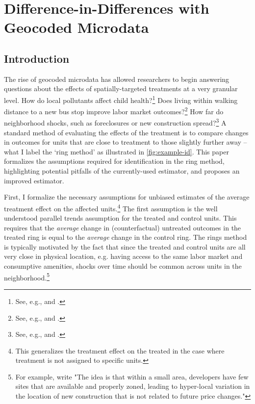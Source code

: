 \chapter{Difference-in-Differences with Geocoded Microdata}\label{chapter:geocoded}



\section{Introduction}

The rise of geocoded microdata has allowed researchers to begin answering questions about the effects of spatially-targeted treatments at a very granular level. How do local pollutants affect child health?\footnote{See, e.g., \citet{Currie_Davis_Greenstone_Walker_2015} and \citet{Marcus_2021}.} Does living within walking distance to a new bus stop improve labor market outcomes?\footnote{See, e.g., \citet{gibbons2005valuing} and \citet{billings2011estimating}.} How far do neighborhood shocks, such as foreclosures or new construction spread?\footnote{See, e.g., \citet{Asquith_Mast_Reed_2021,cui2015foreclosure,Gerardi_Rosenblatt_Willen_Yao_2015} and \citet{Campbell_Giglio_Pathak_2011}.} A standard method of evaluating the effects of the treatment is to compare changes in outcomes for units that are close to treatment to those slightly further away -- what I label the `ring method' as illustrated in \autoref{fig:example-id}. This paper formalizes the assumptions required for identification in the ring method, highlighting potential pitfalls of the currently-used estimator, and proposes an improved estimator. 

First, I formalize the necessary assumptions for unbiased estimates of the average treatment effect on the affected units.\footnote{This generalizes the treatment effect on the treated in the case where treatment is not assigned to specific units.} The first assumption is the well understood parallel trends assumption for the treated and control units. This requires that the \textit{average} change in (counterfactual) untreated outcomes in the treated ring is equal to the \textit{average} change in the control ring. The rings method is typically motivated by the fact that since the treated and control units are all very close in physical location, e.g. having access to the same labor market and consumptive amenities, shocks over time should be common across units in the neighborhood.\footnote{For example, \citet{Asquith_Mast_Reed_2021} write "The idea is that within a small area, developers have few sites that are available and properly zoned, leading to hyper-local variation in the location of new construction that is not related to future price changes."} 

